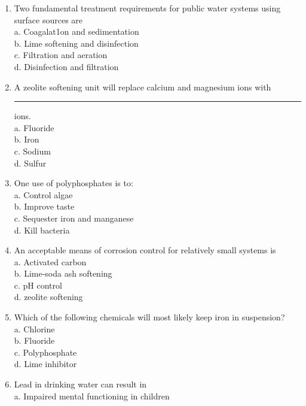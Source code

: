 \begin{enumerate}
\item Two fundamental treatment requirements for public water systems using surface sources are\\
a. Coagalat1on and sedimentation\\
b. Lime softening and disinfection\\
c. Filtration and aeration \\
d. Disinfection and filtration

\item A zeolite softening unit will replace calcium and magnesium ions with \rule{1.5cm}{0.3mm} ions.\\
a. Fluoride\\
b. Iron\\
c. Sodium\\
d. Sulfur\\

\item One use of polyphosphates is to:\\
a. Control algae\\
b. Improve taste\\
c. Sequester iron and manganese\\
d. Kill bacteria

\item An acceptable means of corrosion control for relatively small systems is\\
a. Activated carbon\\
b. Lime-soda ash softening\\
c. pH control\\
d. zeolite softening



\item Which of the following chemicals will most likely keep iron in suspension?\\


a. Chlorine\\

b. Fluoride\\

c. Polyphosphate\\

d. Lime inhibitor\\


\item Lead in drinking water can result in\\


a. Impaired mental functioning in children\\


\end{enumerate}

